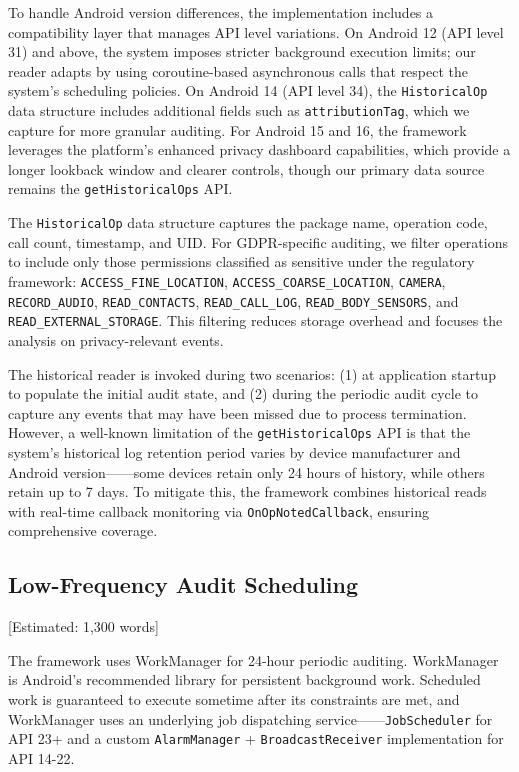 To handle Android version differences, the implementation includes a compatibility layer that manages API level variations. On Android 12 (API level 31) and above, the system imposes stricter background execution limits; our reader adapts by using coroutine-based asynchronous calls that respect the system's scheduling policies. On Android 14 (API level 34), the \texttt{HistoricalOp} data structure includes additional fields such as \texttt{attributionTag}, which we capture for more granular auditing. For Android 15 and 16, the framework leverages the platform's enhanced privacy dashboard capabilities, which provide a longer lookback window and clearer controls, though our primary data source remains the \texttt{getHistoricalOps} API.

The \texttt{HistoricalOp} data structure captures the package name, operation code, call count, timestamp, and UID. For GDPR-specific auditing, we filter operations to include only those permissions classified as sensitive under the regulatory framework: \texttt{ACCESS\_FINE\_LOCATION}, \texttt{ACCESS\_COARSE\_LOCATION}, \texttt{CAMERA}, \texttt{RECORD\_AUDIO}, \texttt{READ\_CONTACTS}, \texttt{READ\_CALL\_LOG}, \texttt{READ\_BODY\_SENSORS}, and \texttt{READ\_EXTERNAL\_STORAGE}. This filtering reduces storage overhead and focuses the analysis on privacy-relevant events.

The historical reader is invoked during two scenarios: (1) at application startup to populate the initial audit state, and (2) during the periodic audit cycle to capture any events that may have been missed due to process termination. However, a well-known limitation of the \texttt{getHistoricalOps} API is that the system's historical log retention period varies by device manufacturer and Android version——some devices retain only 24 hours of history, while others retain up to 7 days. To mitigate this, the framework combines historical reads with real-time callback monitoring via \texttt{OnOpNotedCallback}, ensuring comprehensive coverage.

\subsection{Low-Frequency Audit Scheduling} [Estimated: 1,300 words]

The framework uses WorkManager for 24-hour periodic auditing. WorkManager is Android's recommended library for persistent background work. Scheduled work is guaranteed to execute sometime after its constraints are met, and WorkManager uses an underlying job dispatching service——\texttt{JobScheduler} for API 23+ and a custom \texttt{AlarmManager} + \texttt{BroadcastReceiver} implementation for API 14-22.

